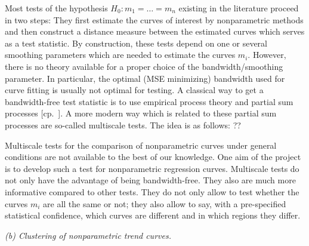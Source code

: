 \documentclass[a4paper,12pt]{article}
\begin{document}
Most tests of the hypothesis $H_0: m_1 = \ldots = m_n$ existing in the literature proceed in two steps: They first estimate the curves of interest by nonparametric methods and then construct a distance measure between the estimated curves which serves as a test statistic. By construction, these tests depend on one or several smoothing parameters which are needed to estimate the curves $m_i$. However, there is no theory available for a proper choice of the bandwidth/smoothing parameter. In particular, the optimal (MSE minimizing) bandwidth used for curve fitting is usually not optimal for testing. A classical way to get a bandwidth-free test statistic is to use empirical process theory and partial sum processes [cp.\ \cite{Hidalgo2014}]. A more modern way which is related to these partial sum processes are so-called multiscale tests. The idea is as follows: ?? 


Multiscale tests for the comparison of nonparametric curves under general conditions are not available to the best of our knowledge. One aim of the project is to develop such a test for nonparametric regression curves. Multiscale tests do not only have the advantage of being bandwidth-free. They also are much more informative compared to other tests. They do not only allow to test whether the curves $m_i$ are all the same or not; they also allow to say, with a pre-specified statistical confidence, which curves are different and in which regions they differ.  
\vspace{15pt}


\noindent \textit{(b) Clustering of nonparametric trend curves. } 
\vspace{10pt} 


\end{document}
